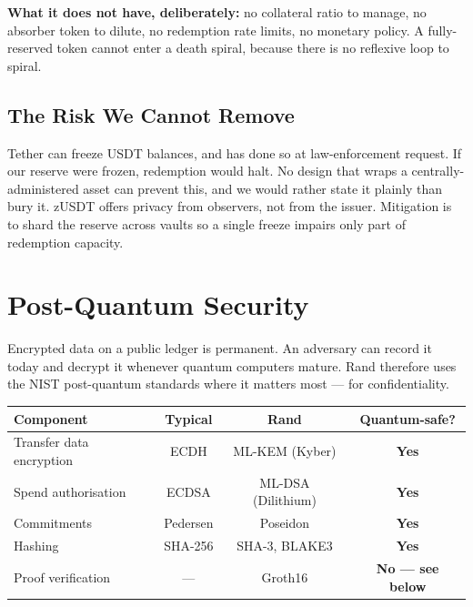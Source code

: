 \documentclass[11pt,a4paper]{article}
\begin{document}
\textbf{What it does not have, deliberately:} no collateral ratio to manage, no absorber token to dilute, no redemption rate limits, no monetary policy. A fully-reserved token cannot enter a death spiral, because there is no reflexive loop to spiral.

\begin{center}
\end{center}

\subsection{The Risk We Cannot Remove}

Tether can freeze USDT balances, and has done so at law-enforcement request. If our reserve were frozen, redemption would halt. No design that wraps a centrally-administered asset can prevent this, and we would rather state it plainly than bury it. zUSDT offers privacy from observers, not from the issuer. Mitigation is to shard the reserve across vaults so a single freeze impairs only part of redemption capacity.

\section{Post-Quantum Security}

Encrypted data on a public ledger is permanent. An adversary can record it today and decrypt it whenever quantum computers mature. Rand therefore uses the NIST post-quantum standards where it matters most --- for confidentiality.

\begin{table}[h]
\centering
\begin{tabular}{@{}lccc@{}}
\toprule
\textbf{Component} & \textbf{Typical} & \textbf{Rand} & \textbf{Quantum-safe?} \\ \midrule
Transfer data encryption & ECDH & ML-KEM (Kyber) & \textbf{Yes} \\
Spend authorisation & ECDSA & ML-DSA (Dilithium) & \textbf{Yes} \\
Commitments & Pedersen & Poseidon & \textbf{Yes} \\
Hashing & SHA-256 & SHA-3, BLAKE3 & \textbf{Yes} \\
Proof verification & --- & Groth16 & \textbf{No --- see below} \\ \bottomrule
\end{tabular}
\end{table}
\end{document}
